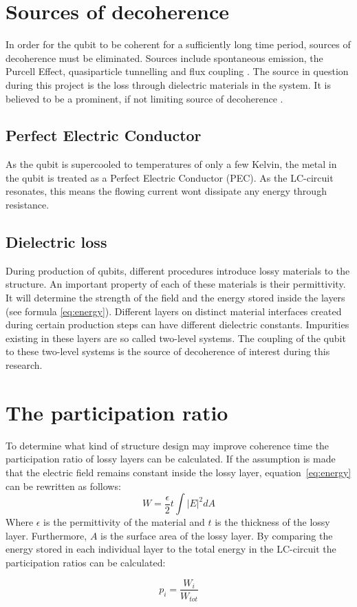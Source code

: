 \section{Sources of decoherence}
In order for the qubit to be coherent for a sufficiently long time period, sources of decoherence must be eliminated. Sources include spontaneous emission, the Purcell Effect, quasiparticle tunnelling and flux coupling \cite{Koch2007}.   
The source in question during this project is the loss through dielectric materials in the system. It is believed to be a prominent, if not limiting source of decoherence \cite{Koch2007}\cite{PhysRevLett.95.210503}. 
 
\subsection{Perfect Electric Conductor}
As the qubit is supercooled to temperatures of only a few Kelvin, the metal in the qubit is treated as a Perfect Electric Conductor (PEC). As the LC-circuit resonates, this means the flowing current wont dissipate any energy through resistance. 
 
\subsection{Dielectric loss}
During production of qubits, different procedures introduce lossy materials to the structure. An important property of each of these materials is their permittivity. It will determine the strength of the field and the energy stored inside the layers (see formula \eqref{eq:energy}). Different layers on distinct material interfaces created during certain production steps can have different dielectric constants.   
Impurities existing in these layers are so called two-level systems. The coupling of the qubit to these two-level systems is the source of decoherence of interest during this research. 

\section{The participation ratio}
To determine what kind of structure design may improve coherence time the participation ratio of lossy layers can be calculated. If the assumption is made that the electric field remains constant inside the lossy layer, equation~\eqref{eq:energy} can be rewritten as follows:
\begin{equation}\label{eq:energy_layer}
W = \frac{\epsilon}{2}t\int{|E|}^{2}dA
\end{equation}
Where \(\epsilon\) is the permittivity of the material and \(t\) is the thickness of the lossy layer. Furthermore, \(A\) is the surface area of the lossy layer. By comparing the energy stored in each individual layer to the total energy in the LC-circuit the participation ratios can be calculated:

\begin{equation}
p_{\textit{i}}=\frac{W_{\textit{i}}}{W_{tot}}
\end{equation}


